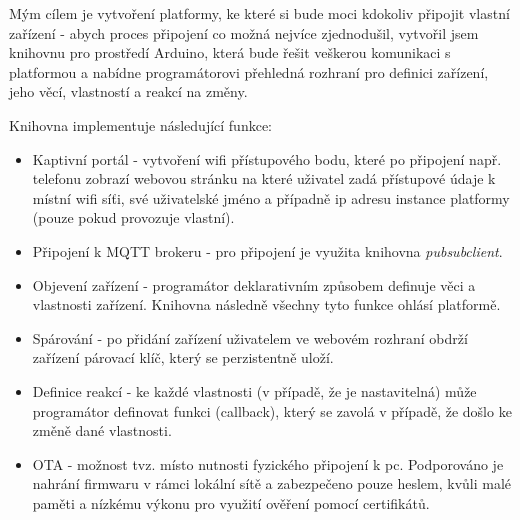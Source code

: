 Mým cílem je vytvoření platformy, ke které si bude moci kdokoliv připojit vlastní zařízení - abych proces připojení co možná nejvíce zjednodušil, vytvořil jsem knihovnu pro prostředí Arduino, která bude řešit veškerou komunikaci s platformou a nabídne programátorovi přehledná rozhraní pro definici zařízení, jeho věcí, vlastností a reakcí na změny.

Knihovna implementuje následující funkce:
\begin{itemize}
    \item Kaptivní portál - vytvoření wifi přístupového bodu, které po připojení např. telefonu zobrazí webovou stránku na které uživatel zadá přístupové údaje k místní wifi síťi, své uživatelské jméno a případně ip adresu instance platformy (pouze pokud provozuje vlastní).
    \item Připojení k MQTT brokeru - pro připojení je využita knihovna \textit{pubsubclient}.
    \item Objevení zařízení - programátor deklarativním způsobem definuje věci a vlastnosti zařízení. Knihovna následně všechny tyto funkce ohlásí platformě.
    \item Spárování - po přidání zařízení uživatelem ve webovém rozhraní obdrží zařízení párovací klíč, který se perzistentně uloží.
    \item Definice reakcí - ke každé vlastnosti (v případě, že je nastavitelná) může programátor definovat funkci (callback), který se zavolá v případě, že došlo ke změně dané vlastnosti.
    \item OTA - možnost tvz.  místo nutnosti fyzického připojení k pc. Podporováno je nahrání firmwaru v rámci lokální sítě a zabezpečeno pouze heslem, kvůli malé paměti a nízkému výkonu pro využití ověření pomocí certifikátů.
\end{itemize}